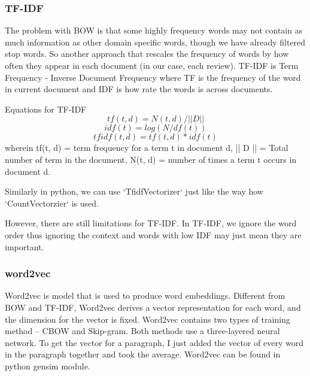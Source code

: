 \documentclass[paper=a4, fontsize=11pt, UTF8]{article} %
\begin{document}
\subsubsection{TF-IDF}
The problem with BOW is that some highly frequency words may not contain as much information as other domain specific words, though we have already filtered stop words. So another approach that rescales the frequency of words by how often they appear in each document (in our case, each review). TF-IDF is Term Frequency - Inverse Document Frequency where TF is the frequency of the word in current document and IDF is how rate the words is across documents. 

Equations for TF-IDF
$$
tf(t, d) = N(t, d) / || D ||
$$
$$
idf(t) = log(N/ df(t))
$$
$$
tfidf(t, d) = tf(t, d)*idf(t)
$$
wherein tf(t, d) = term frequency for a term t in document d, || D || = Total number of term in the document, N(t, d) = number of times a term t occurs in document d.

Similarly in python, we can use `TfidfVectorizer` just like the way how `CountVectorzier` is used.

However, there are still limitations for TF-IDF. In TF-IDF, we ignore the word order thus ignoring the context and words with low IDF may just mean they are important.

\subsubsection{word2vec}
Word2vec is model that is used to produce word embeddings. Different from BOW and TF-IDF, Word2vec derives a vector representation for each word, and the dimension for the vector is fixed. Word2vec contains two types of training method -- CBOW and Skip-gram. Both methods use a three-layered neural network. To get the vector for a paragraph, I just added the vector of every word in the paragraph together and took the average. Word2vec can be found in python gensim module.
\end{document}
